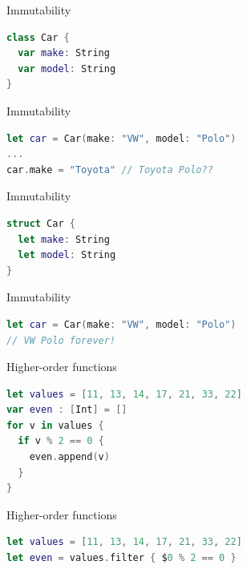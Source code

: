 \documentclass[aspectratio=169]{beamer}
\begin{document}
\begin{frame}[fragile,t]
    \vspace{0.8em}
    \Huge{Immutability}

    \begin{lstlisting}[language=Swift]
class Car {
  var make: String
  var model: String
}
    \end{lstlisting}
\end{frame}

\begin{frame}[fragile,t]
    \vspace{0.8em}
    \Huge{Immutability}

    \begin{lstlisting}[language=Swift]
let car = Car(make: "VW", model: "Polo")
...
car.make = "Toyota" // Toyota Polo??
    \end{lstlisting}
\end{frame}

\begin{frame}[fragile,t]
    \vspace{0.8em}
    \Huge{Immutability}

    \begin{lstlisting}[language=Swift]
struct Car {
  let make: String
  let model: String
}
    \end{lstlisting}
\end{frame}

\begin{frame}[fragile,t]
    \vspace{0.8em}
    \Huge{Immutability}

    \begin{lstlisting}[language=Swift]
let car = Car(make: "VW", model: "Polo")
// VW Polo forever!
    \end{lstlisting}
\end{frame}

\begin{frame}[fragile,t]
    \vspace{0.8em}
    \Huge{Higher-order functions}

    \begin{lstlisting}[language=Swift]
let values = [11, 13, 14, 17, 21, 33, 22]
var even : [Int] = []
for v in values {
  if v % 2 == 0 {
    even.append(v)
  }
}
    \end{lstlisting}
\end{frame}

\begin{frame}[fragile,t]
    \vspace{0.8em}
    \Huge{Higher-order functions}

    \begin{lstlisting}[language=Swift]
let values = [11, 13, 14, 17, 21, 33, 22]
let even = values.filter { $0 % 2 == 0 }
    \end{lstlisting}
\end{frame}
\end{document}
